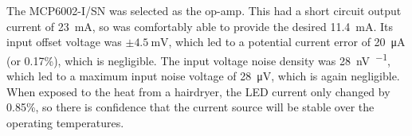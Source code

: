 

The MCP6002-I/SN \cite{mcp6002} was selected as the op-amp. This had a short circuit output current of \SI{23}{\milli\ampere}, so was comfortably able to provide the desired \SI{11.4}{\milli\ampere}. Its input offset voltage was $\pm\SI{4.5}{\milli\volt}$, which led to a potential current error of \SI{20}{\micro\ampere} (or 0.17\%), which is negligible. The input voltage noise density was \SI{28}{\nano\volt\per\sqrt{\hertz}}, which led to a maximum input noise voltage of \SI{28}{\micro\volt}, which is again negligible. When exposed to the heat from a hairdryer, the LED current only changed by 0.85\%, so there is confidence that the current source will be stable over the operating temperatures.\\

